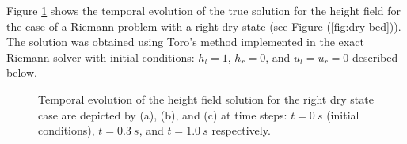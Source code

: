\documentclass[9pt,a4paper]{article}
\newcommand{\Fig}[1]{Figure (\ref{fig:#1})}
\begin{document}
	Figure \ref{right}  shows the temporal evolution of the true solution  for the height field for the case of a Riemann problem with a right dry state (see  \Fig{dry-bed}). The solution was obtained using Toro's method implemented in the exact Riemann solver with initial conditions: $h_l  = 1$, $h_r = 0$, and  $u_l = u_r = 0$ described  below.
	\begin{figure}[H]
		\hfill
		\caption{Temporal evolution of the height field solution for the right dry state case  are depicted by (a), (b), and (c) at time steps: $t=0~s$ (initial conditions), $t = 0.3~s$, and $t = 1.0~s$ respectively. }
		\label{right}
	\end{figure}
	
\end{document}
